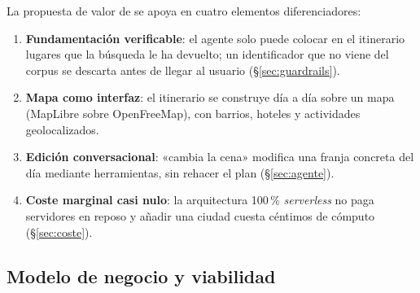 La propuesta de valor de \kyrian{} se apoya en cuatro elementos diferenciadores:
\begin{enumerate}[label=\textbf{D\arabic*}]
  \item \textbf{Fundamentación verificable}: el agente solo puede colocar en el itinerario
        lugares que la búsqueda le ha devuelto; un identificador que no viene del corpus se
        descarta antes de llegar al usuario (§\ref{sec:guardrails}).
  \item \textbf{Mapa como interfaz}: el itinerario se construye día a día sobre un mapa
        (MapLibre sobre OpenFreeMap), con barrios, hoteles y actividades geolocalizados.
  \item \textbf{Edición conversacional}: «cambia la cena» modifica una franja concreta del día mediante
        herramientas, sin rehacer el plan (§\ref{sec:agente}).
  \item \textbf{Coste marginal casi nulo}: la arquitectura 100\,\% \emph{serverless} no paga
        servidores en reposo y añadir una ciudad cuesta céntimos de cómputo (§\ref{sec:coste}).
\end{enumerate}

\subsection{Modelo de negocio y viabilidad}

